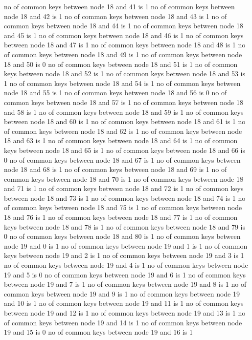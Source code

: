 no of common keys between node 18 and 41 is 1
no of common keys between node 18 and 42 is 1
no of common keys between node 18 and 43 is 1
no of common keys between node 18 and 44 is 1
no of common keys between node 18 and 45 is 1
no of common keys between node 18 and 46 is 1
no of common keys between node 18 and 47 is 1
no of common keys between node 18 and 48 is 1
no of common keys between node 18 and 49 is 1
no of common keys between node 18 and 50 is 0
no of common keys between node 18 and 51 is 1
no of common keys between node 18 and 52 is 1
no of common keys between node 18 and 53 is 1
no of common keys between node 18 and 54 is 1
no of common keys between node 18 and 55 is 1
no of common keys between node 18 and 56 is 0
no of common keys between node 18 and 57 is 1
no of common keys between node 18 and 58 is 1
no of common keys between node 18 and 59 is 1
no of common keys between node 18 and 60 is 1
no of common keys between node 18 and 61 is 1
no of common keys between node 18 and 62 is 1
no of common keys between node 18 and 63 is 1
no of common keys between node 18 and 64 is 1
no of common keys between node 18 and 65 is 1
no of common keys between node 18 and 66 is 0
no of common keys between node 18 and 67 is 1
no of common keys between node 18 and 68 is 1
no of common keys between node 18 and 69 is 1
no of common keys between node 18 and 70 is 1
no of common keys between node 18 and 71 is 1
no of common keys between node 18 and 72 is 1
no of common keys between node 18 and 73 is 1
no of common keys between node 18 and 74 is 1
no of common keys between node 18 and 75 is 1
no of common keys between node 18 and 76 is 1
no of common keys between node 18 and 77 is 1
no of common keys between node 18 and 78 is 1
no of common keys between node 18 and 79 is 0
no of common keys between node 18 and 80 is 1
no of common keys between node 19 and 0 is 1
no of common keys between node 19 and 1 is 1
no of common keys between node 19 and 2 is 1
no of common keys between node 19 and 3 is 1
no of common keys between node 19 and 4 is 1
no of common keys between node 19 and 5 is 0
no of common keys between node 19 and 6 is 1
no of common keys between node 19 and 7 is 1
no of common keys between node 19 and 8 is 1
no of common keys between node 19 and 9 is 1
no of common keys between node 19 and 10 is 1
no of common keys between node 19 and 11 is 1
no of common keys between node 19 and 12 is 1
no of common keys between node 19 and 13 is 1
no of common keys between node 19 and 14 is 1
no of common keys between node 19 and 15 is 0
no of common keys between node 19 and 16 is 1
